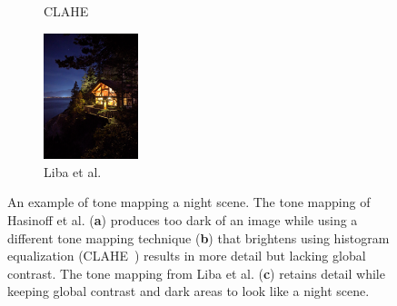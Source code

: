 \documentclass{sig-alternate}
\begin{document}
\begin{figure}
\begin{subfigure}{6.5pc}
\caption{CLAHE}
\label{fig:toneMapping:clahe}
\end{subfigure}
\begin{subfigure}{6.5pc}
\centering
\includegraphics[width=6.5pc]{figures/liba2019-figure-14c-95quality.jpg}
\caption{Liba et al.}
\label{fig:toneMapping:liba}
\end{subfigure}

\caption{An example of tone mapping a night scene. The tone mapping of Hasinoff et al. \cite{Hasinoff2016} (\textbf{a}) produces too dark of an image while using a different tone mapping technique (\textbf{b}) that brightens using histogram equalization (CLAHE~\cite{CLAHE}) results in more detail but lacking global contrast. The tone mapping from Liba et al. (\textbf{c}) retains detail while keeping global contrast and dark areas to look like a night scene.~\cite{Liba2019}}

\label{fig:toneMapping}
\end{figure}
\end{document}
